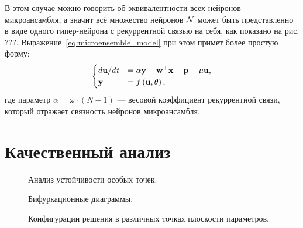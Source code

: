 В этом случае можно говорить об эквивалентности всех нейронов микроансамбля, а значит всё множество нейронов $\mathcal{N}$ может быть представленно в виде одного гипер-нейрона с рекуррентной связью на себя, как показано на рис. ???. Выражение~\eqref{eq:microensemble_model} при этом примет более простую форму:
\begin{equation}
    \label{eq:simple_microensemble_model}
    \begin{cases}
    d\mathrm{\mathbf{u}}/d\mathit{t} &= \alpha \mathrm{\mathbf{y}} + \mathrm{\mathbf{w}}^{\top} \mathrm{\mathbf{x}} - \mathrm{\mathbf{p}} - \mu \mathrm{\mathbf{u}}, \\
    \mathrm{\mathbf{y}}              &= f\left( \mathrm{\mathbf{u}}, \theta \right), \\
    \end{cases}
\end{equation}
где параметр $\alpha = \omega \cdot \left( N - 1 \right)$ --- весовой коэффициент рекуррентной связи, который отражает связность нейронов микроансамбля.

\newpage
\section{Качественный анализ} \label{section:neuron_equilibrium}



\begin{figure}[ht]
    \caption{Анализ устойчивости особых точек.}
    \label{img:model_sigm_equilibriums}
\end{figure}

\begin{figure}[ht]
    \caption{Бифуркационные диаграммы.}
    \label{img:model_sigm_bifurcations}
\end{figure}

\begin{figure}[ht]
    \caption{Конфигурации решения в различных точках плоскости параметров.}
    \label{img:model_sigm_configurations}
\end{figure}


